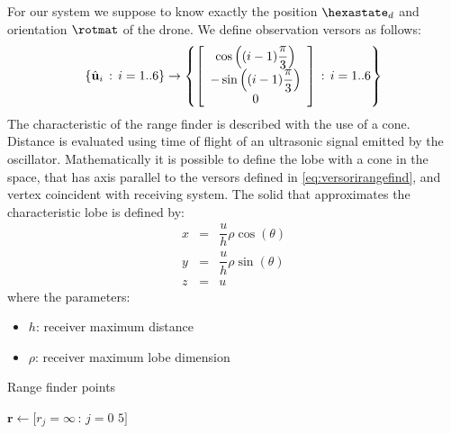 For our system we suppose to know exactly the position $\hexastate_d$ and orientation $\rotmat$ of the drone. We define observation versors as follows:
\begin{equation}
\label{eq:versorirangefind}
\left\{ \hat{\mathbf{u}}_i \,:\, i=1..6 \right\} \rightarrow \left\{ \left[\begin{array}{c}\cos\left( (i-1)\dfrac{\pi}{3} \right) \\ -\sin\left( (i-1)\dfrac{\pi}{3} \right) \\0\end{array}\right] \,:\, i=1..6 \right\}
\end{equation}
The characteristic of the range finder is described with the use of a cone. Distance is evaluated using time of flight of an ultrasonic signal emitted by the oscillator. Mathematically it is possible to define the lobe with a cone in the space, that has axis parallel to the versors defined in \ref{eq:versorirangefind}, and vertex coincident with receiving system. The solid that approximates the characteristic lobe is defined by:
\begin{equation}
\begin{array}{rcl}
x &=& \dfrac{u}{h} \rho \cos(\theta) \\
y &=& \dfrac{u}{h} \rho \sin(\theta) \\
z &=& u
\end{array}
\end{equation}
where the parameters:
\begin{itemize}
\item $h$: receiver maximum distance
\item $\rho$: receiver maximum lobe dimension
\end{itemize}

\begin{algorithm}[h]
\label{alg:rangefinder}
\caption{Range finder points}
$\mathbf{r} \leftarrow [r_j = \infty\,:\,j=0$ \KwTo $5]$\;
\end{algorithm}

